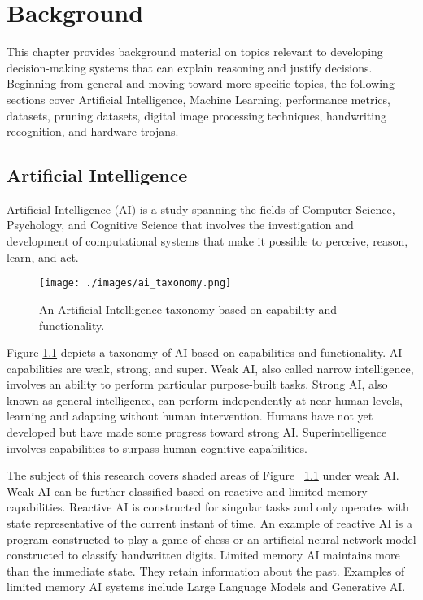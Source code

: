 \chapter{Background} \label{ch:background}

This chapter provides background material on topics relevant to developing
decision-making systems that can explain reasoning and justify decisions.
Beginning from general and moving toward more specific topics, the following
sections cover Artificial Intelligence, Machine Learning, performance metrics,
datasets, pruning datasets, digital image processing techniques, handwriting
recognition, and hardware trojans.

\section{Artificial Intelligence}\label{sec:ai}

Artificial Intelligence (AI) is a study spanning the fields of Computer Science,
Psychology, and Cognitive Science that involves the investigation and
development of computational systems that make it possible to perceive, reason,
learn, and act\cite{winston1992artificial, simon1995artificial,
russell2016artificial, tzimas2021legal}.

\begin{figure}[h]
    \centering
    \texttt{[image: ./images/ai\_taxonomy.png]}
    \caption{An Artificial Intelligence taxonomy based on capability and functionality.}
    \label{fig:ai_taxonomy}
\end{figure}

Figure \ref{fig:ai_taxonomy} depicts a taxonomy of AI based on capabilities and
functionality. AI capabilities are weak, strong, and super. Weak AI, also called
narrow intelligence, involves an ability to perform particular purpose-built
tasks. Strong AI, also known as general intelligence, can perform independently
at near-human levels, learning and adapting without human intervention. Humans
have not yet developed but have made some progress toward strong AI.
Superintelligence involves capabilities to surpass human cognitive
capabilities\cite{tzimas2021legal, samoili2020ai, Breen2024}.

The subject of this research covers shaded areas of Figure
~\ref{fig:ai_taxonomy} under weak AI. Weak AI can be further classified based on
reactive and limited memory capabilities. Reactive AI is constructed for
singular tasks and only operates with state representative of the current
instant of time. An example of reactive AI is a program constructed to play a
game of chess or an artificial neural network model constructed to classify
handwritten digits. Limited memory AI maintains more than the immediate state.
They retain information about the past. Examples of limited memory AI systems
include Large Language Models and Generative AI\cite{schossau2023towards}.


